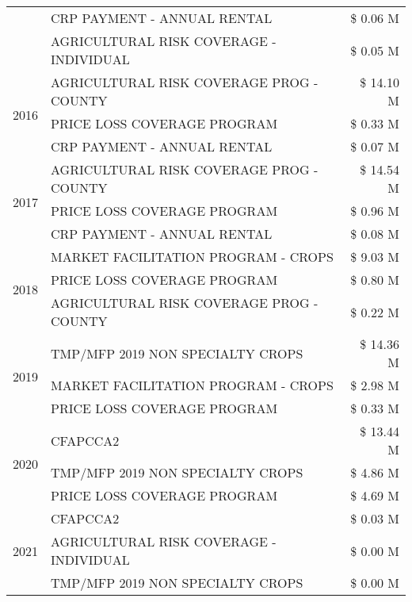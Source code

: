 \begin{tabular}{llr}
 & CRP PAYMENT - ANNUAL RENTAL & \$ 0.06 M \\
 & AGRICULTURAL RISK COVERAGE - INDIVIDUAL & \$ 0.05 M \\
\cline{1-3}
\multirow[t]{3}{*}{2016} & AGRICULTURAL RISK COVERAGE PROG - COUNTY & \$ 14.10 M \\
 & PRICE LOSS COVERAGE PROGRAM & \$ 0.33 M \\
 & CRP PAYMENT - ANNUAL RENTAL & \$ 0.07 M \\
\cline{1-3}
\multirow[t]{3}{*}{2017} & AGRICULTURAL RISK COVERAGE PROG - COUNTY & \$ 14.54 M \\
 & PRICE LOSS COVERAGE PROGRAM & \$ 0.96 M \\
 & CRP PAYMENT - ANNUAL RENTAL & \$ 0.08 M \\
\cline{1-3}
\multirow[t]{3}{*}{2018} & MARKET FACILITATION PROGRAM - CROPS & \$ 9.03 M \\
 & PRICE LOSS COVERAGE PROGRAM & \$ 0.80 M \\
 & AGRICULTURAL RISK COVERAGE PROG - COUNTY & \$ 0.22 M \\
\cline{1-3}
\multirow[t]{3}{*}{2019} & TMP/MFP 2019 NON SPECIALTY CROPS & \$ 14.36 M \\
 & MARKET FACILITATION PROGRAM - CROPS & \$ 2.98 M \\
 & PRICE LOSS COVERAGE PROGRAM & \$ 0.33 M \\
\cline{1-3}
\multirow[t]{3}{*}{2020} & CFAPCCA2 & \$ 13.44 M \\
 & TMP/MFP 2019 NON SPECIALTY CROPS & \$ 4.86 M \\
 & PRICE LOSS COVERAGE PROGRAM & \$ 4.69 M \\
\cline{1-3}
\multirow[t]{3}{*}{2021} & CFAPCCA2 & \$ 0.03 M \\
 & AGRICULTURAL RISK COVERAGE - INDIVIDUAL & \$ 0.00 M \\
 & TMP/MFP 2019 NON SPECIALTY CROPS & \$ 0.00 M \\
\cline{1-3}
\bottomrule
\end{tabular}
